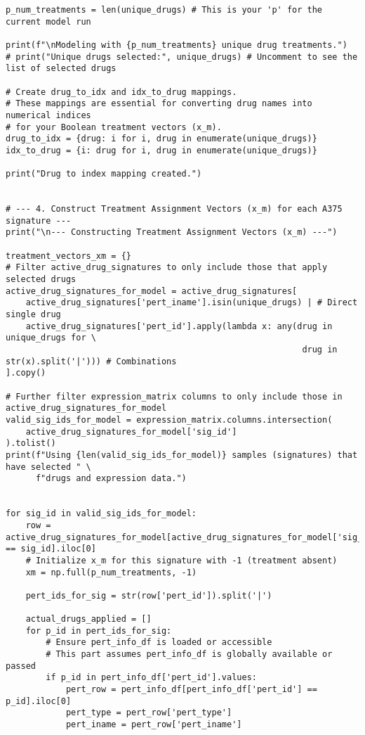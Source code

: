 \documentclass[12pt]{article}
\begin{document}
\begin{lstlisting}[caption={Python Analysis Script}]
p_num_treatments = len(unique_drugs) # This is your 'p' for the current model run

print(f"\nModeling with {p_num_treatments} unique drug treatments.")
# print("Unique drugs selected:", unique_drugs) # Uncomment to see the list of selected drugs

# Create drug_to_idx and idx_to_drug mappings.
# These mappings are essential for converting drug names into numerical indices
# for your Boolean treatment vectors (x_m).
drug_to_idx = {drug: i for i, drug in enumerate(unique_drugs)}
idx_to_drug = {i: drug for i, drug in enumerate(unique_drugs)}

print("Drug to index mapping created.")


# --- 4. Construct Treatment Assignment Vectors (x_m) for each A375 signature ---
print("\n--- Constructing Treatment Assignment Vectors (x_m) ---")

treatment_vectors_xm = {}
# Filter active_drug_signatures to only include those that apply selected drugs
active_drug_signatures_for_model = active_drug_signatures[
    active_drug_signatures['pert_iname'].isin(unique_drugs) | # Direct single drug
    active_drug_signatures['pert_id'].apply(lambda x: any(drug in unique_drugs for \
                                                           drug in str(x).split('|'))) # Combinations
].copy()

# Further filter expression_matrix columns to only include those in active_drug_signatures_for_model
valid_sig_ids_for_model = expression_matrix.columns.intersection(
    active_drug_signatures_for_model['sig_id']
).tolist()
print(f"Using {len(valid_sig_ids_for_model)} samples (signatures) that have selected " \
      f"drugs and expression data.")


for sig_id in valid_sig_ids_for_model:
    row = active_drug_signatures_for_model[active_drug_signatures_for_model['sig_id'] == sig_id].iloc[0]
    # Initialize x_m for this signature with -1 (treatment absent)
    xm = np.full(p_num_treatments, -1)

    pert_ids_for_sig = str(row['pert_id']).split('|')

    actual_drugs_applied = []
    for p_id in pert_ids_for_sig:
        # Ensure pert_info_df is loaded or accessible
        # This part assumes pert_info_df is globally available or passed
        if p_id in pert_info_df['pert_id'].values:
            pert_row = pert_info_df[pert_info_df['pert_id'] == p_id].iloc[0]
            pert_type = pert_row['pert_type']
            pert_iname = pert_row['pert_iname']


\end{lstlisting}
\end{document}
